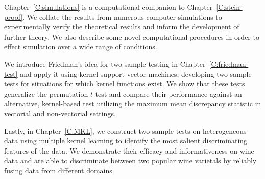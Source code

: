 Chapter~\ref{C:simulations} is a computational companion to
Chapter~\ref{C:stein-proof}.  We collate the results from numerous
computer simulations to experimentally verify the theoretical results
and inform the development of further theory.  We also describe some
novel computational procedures in order to effect simulation over a
wide range of conditions.

We introduce Friedman's idea for two-sample testing in
Chapter~\ref{C:friedman-test} and apply it using kernel support vector
machines, developing two-sample tests for situations for which
kernel functions exist.  We show that these tests generalize the
permutation $t$-test and compare their performance against an
alternative, kernel-based test utilizing the maximum mean discrepancy
statistic in vectorial and non-vectorial settings.

Lastly, in Chapter~\ref{C:MKL}, we construct two-sample tests on
heterogeneous data using multiple kernel learning to identify the most
salient discriminating features of the data.  We demonstrate their
efficacy and informativeness on wine data and are able to discriminate
between two popular wine varietals by reliably fusing data from
different domains.